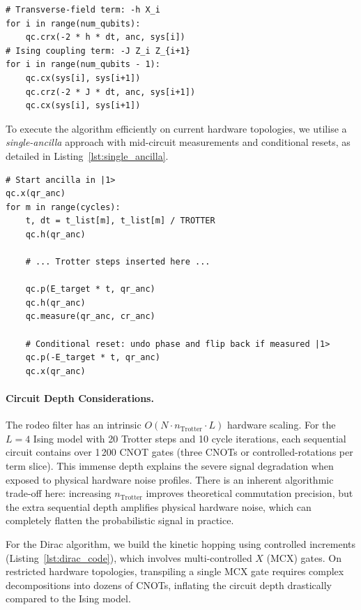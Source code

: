 \documentclass[twocolumn,10pt]{article}
\begin{document}
\begin{lstlisting}[caption={Controlled Trotter step for the Ising
Hamiltonian (one slice).},label={lst:trotter},float=*]
# Transverse-field term: -h X_i
for i in range(num_qubits):
    qc.crx(-2 * h * dt, anc, sys[i])
# Ising coupling term: -J Z_i Z_{i+1}
for i in range(num_qubits - 1):
    qc.cx(sys[i], sys[i+1])
    qc.crz(-2 * J * dt, anc, sys[i+1])
    qc.cx(sys[i], sys[i+1])
\end{lstlisting}

To execute the algorithm efficiently on current hardware topologies, we
utilise a \emph{single-ancilla} approach with mid-circuit measurements and 
conditional resets, as detailed in Listing~\ref{lst:single_ancilla}.

\begin{lstlisting}[caption={Single-ancilla rodeo filter with mid-circuit
measurement and conditional phase reset for hardware execution.},label={lst:single_ancilla},float=*]
# Start ancilla in |1>
qc.x(qr_anc)  
for m in range(cycles):
    t, dt = t_list[m], t_list[m] / TROTTER
    qc.h(qr_anc)
    
    # ... Trotter steps inserted here ...
    
    qc.p(E_target * t, qr_anc)
    qc.h(qr_anc)
    qc.measure(qr_anc, cr_anc)
    
    # Conditional reset: undo phase and flip back if measured |1>
    qc.p(-E_target * t, qr_anc)
    qc.x(qr_anc)
\end{lstlisting}

\paragraph{Circuit Depth Considerations.}
The rodeo filter has an intrinsic $O(N \cdot n_{\text{Trotter}} \cdot L)$ hardware scaling.
For the $L=4$ Ising model with 20 Trotter steps and 10 cycle iterations, each sequential
circuit contains over 1\,200 CNOT gates (three CNOTs or controlled-rotations
per term slice). 
This immense depth explains the severe signal degradation when exposed
to physical hardware noise profiles. There is an inherent algorithmic trade-off 
here: increasing $n_{\text{Trotter}}$ improves theoretical commutation precision, 
but the extra sequential depth amplifies physical hardware noise, which can completely 
flatten the probabilistic signal in practice.

For the Dirac algorithm, we build the kinetic hopping using controlled
increments (Listing~\ref{lst:dirac_code}), which involves multi-controlled 
$X$ (MCX) gates. On restricted hardware topologies, transpiling a single MCX gate 
requires complex decompositions into dozens of CNOTs, inflating the circuit 
depth drastically compared to the Ising model.
\end{document}
